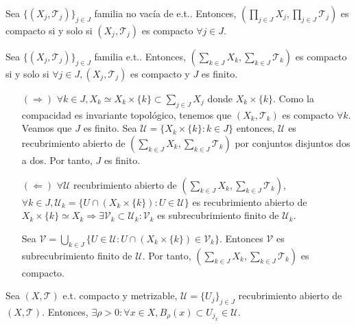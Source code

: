 \begin{theo}[de Tychonoff]
  Sea $\{ ( X_{j}, \mathcal{T}_{j} ) \}_{j \in J}$ familia no vacía de e.t.. Entonces, $( \prod_{j \in J} X_{j}, \prod_{j \in J} \mathcal{T}_{j} )$ es compacto si y solo si $( X_{j}, \mathcal{T}_{j} )$ es compacto $\forall j \in J$.
\end{theo}

\begin{prop}
  Sea $\{ ( X_{j}, \mathcal{T}_{j} ) \}_{j \in J}$ familia e.t.. Entonces, $( \sum_{k \in J} X_{k}, \sum_{k \in J} \mathcal{T}_{k})$ es compacto si y solo si $\forall j \in J, ( X_{j}, \mathcal{T}_{j} )$ es compacto y $J$ es finito.
\end{prop}

\begin{dem}
  \begin{enumerate}[label=(\roman*)]
    \item []
    \item [$(\Rightarrow)$] $\forall k \in J, X_{k} \simeq X_{k} \times \{ k \} \subset \sum_{j \in J} X_{j}$ donde $X_{k} \times \{ k \}$. Como la compacidad es invariante topológico, tenemos que $( X_{k}, \mathcal{T}_{k} )$ es compacto $\forall k$. Veamos que $J$ es finito. Sea $\mathcal{U} = \{ X_{k} \times \{ k \} : k \in J \}$ entonces, $\mathcal{U}$ es recubrimiento abierto de $( \sum_{k \in J} X_{k}, \sum_{k \in J} \mathcal{T}_{k})$ por conjuntos disjuntos dos a dos. Por tanto, $J$ es finito.

    \item [$(\Leftarrow)$] $\forall \mathcal{U}$ recubrimiento abierto de $( \sum_{k \in J} X_{k}, \sum_{k \in J} \mathcal{T}_{k})$, $\forall k \in J , \mathcal{U}_{k} = \{  U \cap (X_{k} \times \{ k \}) : U \in \mathcal{U} \}$ es recubrimiento abierto de $X_{k} \times \{ k \} \simeq X_{k} \Rightarrow \exists \mathcal{V}_{k} \subset \mathcal{U}_{k} : \mathcal{V}_{k}$ es subrecubrimiento finito de $\mathcal{U}_{k}$. 

      Sea $\mathcal{V} = \bigcup_{k \in J} \{  U \in \mathcal{U} : U \cap (X_{k} \times \{ k \}) \in \mathcal{V}_{k} \}$. Entonces $\mathcal{V}$ es subrecubrimiento finito de $\mathcal{U}$. Por tanto, $( \sum_{k \in J} X_{k}, \sum_{k \in J} \mathcal{T}_{k})$ es compacto.
  \end{enumerate}
\end{dem}

\begin{lem}
  Sea $( X, \mathcal{T} )$ e.t. compacto y metrizable, $\mathcal{U} = \{ U_{j} \}_{j \in J}$ recubrimiento abierto de $( X, \mathcal{T} )$. Entonces, $\exists \rho > 0 : \forall x \in X, B_{\rho}(x) \subset U_{j_{x}} \in \mathcal{U}$.
\end{lem}
